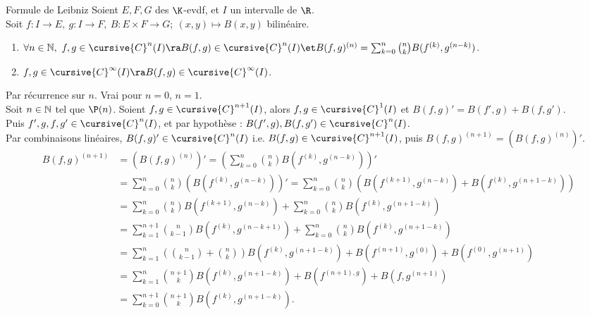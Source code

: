 \documentclass[11pt]{article}
\begin{document}
\begin{prop}{Formule de Leibniz}{}
    Soient $E,F,G$ des $\K$-evdf, et $I$ un intervalle de $\R$.\\
    Soit $f:I\to E, ~ g:I\to F, ~ B:E\times F \to G; ~ (x,y)\mapsto B(x,y)$ bilinéaire.
    \begin{enumerate}
        \item $\forall n \in \N, ~ f,g\in\cursive{C}^n(I) \ra B(f,g)\in\cursive{C}^n(I) \et B(f,g)^{(n)}=\sum_{k=0}^n\binom{n}{k}B(f^{(k)},g^{(n-k)})$.
        \item $f,g\in\cursive{C}^{\infty}(I)\ra B(f,g)\in\cursive{C}^{\infty}(I)$.
    \end{enumerate}
    \tcblower
    Par récurrence sur $n$. Vrai pour $n=0$, $n=1$.\\
    Soit $n\in\mathbb{N}$ tel que $\P(n)$. Soient $f,g\in\cursive{C}^{n+1}(I)$, alors $f,g\in\cursive{C}^1(I)$ et $B(f,g)'=B(f',g)+B(f,g')$.\\
    Puis $f',g,f,g'\in\cursive{C}^n(I)$, et par hypothèse : $B(f',g),B(f,g')\in\cursive{C}^n(I)$.\\
    Par combinaisons linéaires, $B(f,g)'\in\cursive{C}^n(I)$ i.e. $B(f,g)\in\cursive{C}^{n+1}(I)$, puis $B(f,g)^{(n+1)}=(B(f,g)^{(n)})'$.
    \begin{align*}
        B(f,g)^{(n+1)} &= (B(f,g)^{(n)})' = \left( \sum_{k=0}^n\binom{n}{k}B(f^{(k)}, g^{(n-k)}) \right)'\\
        &=\sum_{k=0}^n\binom{n}{k}\left( B(f^{(k)}, g^{(n-k)}) \right) ' = \sum_{k=0}^n\binom{n}{k}(B(f^{(k+1)},g^{(n-k)}) + B(f^{(k)}, g^{(n+1-k)}))\\
        &=\sum_{k=0}^n\binom{n}{k}B(f^{(k+1)},g^{(n-k)})+\sum_{k=0}^n\binom{n}{k}B(f^{(k)},g^{(n+1-k)})\\
        &=\sum_{k=1}^{n+1}\binom{n}{k-1}B(f^{(k)}, g^{(n-k+1)}) + \sum_{k=0}^n\binom{n}{k}B(f^{(k)},g^{(n+1-k)})\\
        &=\sum_{k=1}^n\left( \binom{n}{k-1} + \binom{n}{k} \right)B(f^{(k)},g^{(n+1-k)}) + B(f^{(n+1)}, g^{(0)}) + B(f^{(0)}, g^{(n+1)})\\
        &=\sum_{k=1}^n\binom{n+1}{k}B(f^{(k)},g^{(n+1-k)}) + B(f^{(n+1),g}) + B(f,g^{(n+1)})\\
        &=\sum_{k=0}^{n+1}\binom{n+1}{k}B(f^{(k)},g^{(n+1-k)}).
    \end{align*} 
\end{prop}
\end{document}
